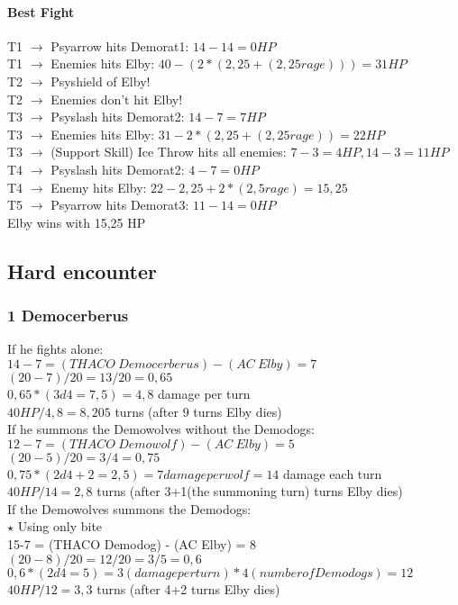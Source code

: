 \paragraph*{Best Fight\\}
T1 $\rightarrow$ Psyarrow hits Demorat1: $14-14 = 0 HP$\\
T1 $\rightarrow$ Enemies hits Elby: $40 - (2*(2,25+(2,25 rage))) = 31 HP$\\
T2 $\rightarrow$ Psyshield of Elby!\\
T2 $\rightarrow$ Enemies don’t hit Elby!\\
T3 $\rightarrow$ Psyslash hits Demorat2: $14 - 7 = 7 HP$\\
T3 $\rightarrow$ Enemies hits Elby: $31 - 2*(2,25+(2,25 rage)) = 22 HP$\\
T3 $\rightarrow$ (Support Skill) Ice Throw hits all enemies: $7 - 3 = 4 HP, 14 - 3 = 11 HP$\\
T4 $\rightarrow$ Psyslash hits Demorat2: $4-7= 0 HP$\\
T4 $\rightarrow$ Enemy hits Elby: $22 - 2,25 + 2 * (2,5 rage) = 15,25$\\
T5 $\rightarrow$ Psyarrow hits Demorat3: $11 - 14 = 0 HP$\\
Elby wins with 15,25 HP

\subsection{Hard encounter}

\subsubsection*{1 Democerberus}
If he fights alone:\\
$14-7 = (THACO\:Democerberus) - (AC\:Elby) = 7$\\
$(20-7)/20 = 13/20 = 0,65$\\
$0,65 * (3d4 = 7,5) = 4,8$ damage per turn\\
$40 HP/ 4,8 = 8,205$ turns (after 9 turns Elby dies)\\
\newline
If he summons the Demowolves without the Demodogs:\\
$12-7 = (THACO\:Demowolf) - (AC\:Elby) = 5$\\
$(20-5)/20 = 3/4 = 0,75$\\
$0,75 * (2d4+2 = 2,5) = 7 damage per wolf = 14$ damage each turn\\
$40 HP/ 14 = 2,8$ turns (after 3+1(the summoning turn) turns Elby dies) \\
\newline
If the Demowolves summons the Demodogs:\\
$\star$ Using only bite\\
15-7 = (THACO Demodog) - (AC Elby) = 8\\
$(20-8)/20 = 12/20 = 3/5 =  0,6$\\
$0,6 * (2d4 = 5) = 3 (damage per turn) * 4 (number of Demodogs) = 12$\\
$40 HP / 12 = 3,3$ turns (after 4+2 turns Elby dies)



